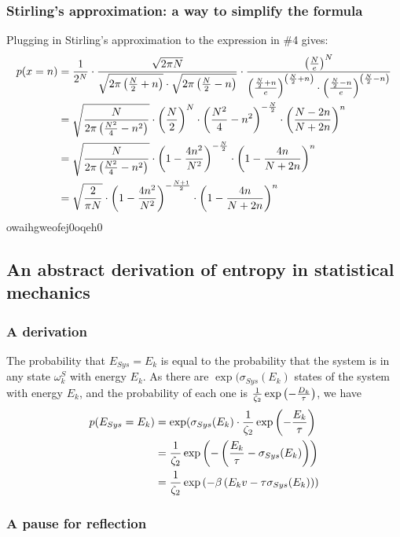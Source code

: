 \documentclass{paper}
\begin{document}
\subsubsection{Stirling's approximation: a way to simplify the formula}

\par Plugging in Stirling's approximation to the expression in \#4 gives:
    \begin{align*}
        p(x=n) &= \frac{1}{2^N} \cdot \frac{\sqrt{2\pi N}}{\sqrt{2\pi \left(\frac{N}{2} + n\right)} \cdot \sqrt{2\pi \left(\frac{N}{2} - n\right)}} \cdot \frac{\left(\frac{N}{e}\right)^N}{\left(\frac{\frac{N}{2} + n}{e}\right)^{\left(\frac{N}{2} + n\right)} \cdot \left(\frac{\frac{N}{2} - n}{e}\right)^{\left(\frac{N}{2} - n\right)}}\\
        &= \sqrt{\frac{N}{2\pi \left(\frac{N^2}{4} - n^2\right)}} \cdot \left(\frac{N}{2}\right)^N \cdot \left(\frac{N^2}{4} - n^2\right)^{-\frac{N}{2}} \cdot \left(\frac{N-2n}{N+2n}\right)^n \\
        &= \sqrt{\frac{N}{2\pi \left(\frac{N^2}{4} - n^2\right)}} \cdot \left(1 - \frac{4n^2}{N^2}\right)^{-\frac{N}{2}} \cdot \left(1 - \frac{4n}{N+2n}\right)^n \\
        &= \sqrt{\frac{2}{\pi N}} \cdot \left(1 - \frac{4n^2}{N^2}\right)^{-\frac{N+1}{2}} \cdot \left(1 - \frac{4n}{N+2n}\right)^n
    \end{align*}
    owaihgweofej0oqeh0

\subsection{An abstract derivation of entropy in statistical mechanics}
\subsubsection{A derivation}

\par The probability that $E_{Sys} = E_k$ is equal to the probability that the system is in any state $\omega^S_k$ with energy $E_k$.  As there are $\exp(\sigma_{Sys}(E_k)$ states of the system with energy $E_k$, and the probability of each one is $\frac{1}{\zeta_2}\exp\left(-\frac{D_k}{\tau}\right)$, we have
    \begin{align*}
        p(E_{Sys} = E_k) &= \exp(\sigma_{Sys}(E_k) \cdot \frac{1}{\zeta_2} \exp \left( - \frac{E_k}{\tau} \right) \\
        &= \frac{1}{\zeta_2} \exp \left( - \left( \frac{E_k}{\tau} - \sigma_{Sys}(E_k) \right) \right) \\
        &= \frac{1}{\zeta_2} \exp \left( -\beta \left( E_kv - \tau \sigma_{Sys}(E_k) \right) \right)
    \end{align*}
    
\subsubsection{A pause for reflection}

    
\end{document}
